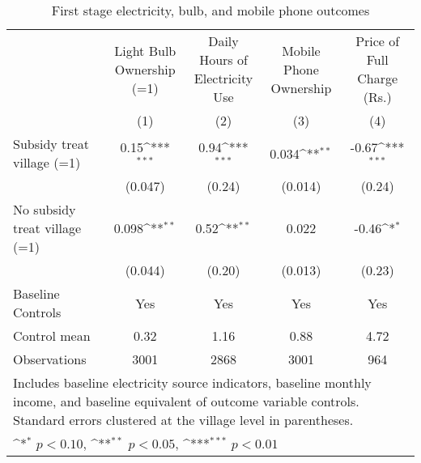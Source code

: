 
\begin{table}[htbp]
\def\sym#1{\ifmmode^{#1}\else\(^{#1}\)\fi}
\caption{First stage electricity, bulb, and mobile phone outcomes\label{tab:firststage}}
\begin{tabular}{l*{4}{c}}
\toprule   & \shortstack{Light Bulb\\Ownership (=1)} & \shortstack{Daily Hours of\\Electricity Use}
& \shortstack{Mobile Phone\\Ownership} & \shortstack{Price of\\Full Charge (Rs.)}\\
& (1) & (2) & (3) & (4) \\ \hline
Subsidy treat village (=1) &     0.15\sym{***}&     0.94\sym{***} &    0.034\sym{**} &    -0.67\sym{***}\\
                               &  (0.047) &   (0.24)         &  (0.014)         &   (0.24)         \\
No subsidy treat village (=1)           &    0.098\sym{**} &     0.52\sym{**} &    0.022         &    -0.46\sym{*}  \\
                                &  (0.044)  &   (0.20)         &  (0.013)         &   (0.23)         \\
                \addlinespace
Baseline Controls         &      Yes         &      Yes        &      Yes         &      Yes         \\

Control mean                          &     0.32 &     1.16             &     0.88         &     4.72         \\
Observations                    &     3001  &     2868        &     3001         &      964         \\
\bottomrule
\multicolumn{5}{p{\textwidth}}{\footnotesize Includes baseline electricity source indicators, baseline monthly income, and baseline equivalent of outcome variable controls. Standard errors clustered at the village level in parentheses.}\\
\multicolumn{5}{p{\textwidth}}{\footnotesize \sym{*} \(p<0.10\), \sym{**} \(p<0.05\), \sym{***} \(p<0.01\)}\\
\end{tabular}
\end{table}
